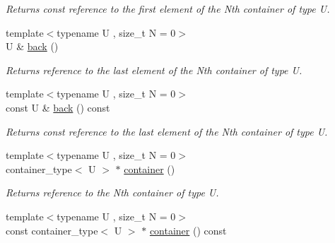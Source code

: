 \begin{DoxyCompactItemize}
\begin{DoxyCompactList}\small\item\em Returns const reference to the first element of the Nth container of type U. \end{DoxyCompactList}\item 
\hypertarget{classheterogeneous_1_1heteroqueue_3_01_t_00_01_types_8_8_8_4_a4dec7542a78e126fad68f55fa4dd4dbe}{}{\footnotesize template$<$typename U , size\+\_\+t N = 0$>$ }\\U \& \hyperlink{classheterogeneous_1_1heteroqueue_3_01_t_00_01_types_8_8_8_4_a4dec7542a78e126fad68f55fa4dd4dbe}{back} ()\label{classheterogeneous_1_1heteroqueue_3_01_t_00_01_types_8_8_8_4_a4dec7542a78e126fad68f55fa4dd4dbe}

\begin{DoxyCompactList}\small\item\em Returns reference to the last element of the Nth container of type U. \end{DoxyCompactList}\item 
\hypertarget{classheterogeneous_1_1heteroqueue_3_01_t_00_01_types_8_8_8_4_a62782178f29d953cc907c977a3e90efc}{}{\footnotesize template$<$typename U , size\+\_\+t N = 0$>$ }\\const U \& \hyperlink{classheterogeneous_1_1heteroqueue_3_01_t_00_01_types_8_8_8_4_a62782178f29d953cc907c977a3e90efc}{back} () const \label{classheterogeneous_1_1heteroqueue_3_01_t_00_01_types_8_8_8_4_a62782178f29d953cc907c977a3e90efc}

\begin{DoxyCompactList}\small\item\em Returns const reference to the last element of the Nth container of type U. \end{DoxyCompactList}\item 
\hypertarget{classheterogeneous_1_1heteroqueue_3_01_t_00_01_types_8_8_8_4_adb86dc2c739512918d7e9b00e073e86d}{}{\footnotesize template$<$typename U , size\+\_\+t N = 0$>$ }\\container\+\_\+type$<$ U $>$ $\ast$ \hyperlink{classheterogeneous_1_1heteroqueue_3_01_t_00_01_types_8_8_8_4_adb86dc2c739512918d7e9b00e073e86d}{container} ()\label{classheterogeneous_1_1heteroqueue_3_01_t_00_01_types_8_8_8_4_adb86dc2c739512918d7e9b00e073e86d}

\begin{DoxyCompactList}\small\item\em Returns reference to the Nth container of type U. \end{DoxyCompactList}\item 
\hypertarget{classheterogeneous_1_1heteroqueue_3_01_t_00_01_types_8_8_8_4_a9e126de157026c800b26e0054c7f330a}{}{\footnotesize template$<$typename U , size\+\_\+t N = 0$>$ }\\const container\+\_\+type$<$ U $>$ $\ast$ \hyperlink{classheterogeneous_1_1heteroqueue_3_01_t_00_01_types_8_8_8_4_a9e126de157026c800b26e0054c7f330a}{container} () const \label{classheterogeneous_1_1heteroqueue_3_01_t_00_01_types_8_8_8_4_a9e126de157026c800b26e0054c7f330a}


\end{DoxyCompactItemize}
